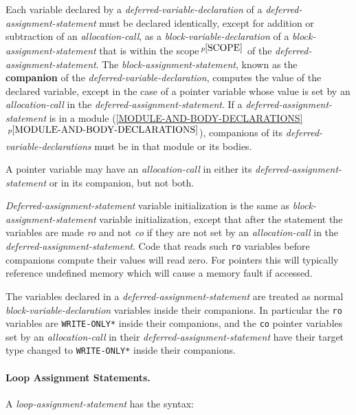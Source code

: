 \documentclass[12pt]{article}
\newcommand{\subsubsubsection}[1]{\paragraph[#1]{#1.}}
\newcommand{\key}[1]{{\rm \bfseries #1}}
\newcommand{\itemref}[1]{\ref{#1}$\,^{p\pageref{#1}}$}
\newcommand{\pagnote}[1]{$\,^{p\pageref{#1}}$}
\newcommand{\EOL}{\penalty \exhyphenpenalty}
\begin{document}
Each variable declared by a {\em deferred-variable-declaration}
of a {\em deferred-assignment-statement} must be declared identically,
except for addition or subtraction of an {\em allocation-call},
as a {\em block-variable-declaration} of a {\em block-assignment-statement}
that is within the scope\pagnote{SCOPE} of the
{\em deferred-assignment-statement}.  The {\em block-assignment-statement},
known as the \key{companion} of the {\em deferred-variable-declaration},
computes the value of the
declared variable, except in the case of a pointer variable whose value is
set by an {\em allocation-call} in the {\em deferred-assignment-statement}.
If a {\em deferred-assignment-statement} is in a module
(\itemref{MODULE-AND-BODY-DECLARATIONS}), companions
of its {\em deferred-variable-declarations}
must be in that module or its bodies.

A pointer variable may have an {\em allocation-call} in either its
{\em deferred-assignment-statement} or in its companion, but not
both.

{\em Deferred-assignment-statement} variable initialization is the
same as {\em block-assignment-state\-ment} variable initialization,
except that after the statement the variables
are made {\em ro} and not {\em co} if they are not set
by an {\em allocation-call} in the {\em deferred-assignment-statement}.
Code that reads such {\tt ro} variables
before companions compute their values will
read zero.  For pointers this will typically reference undefined memory which
will cause a memory fault if accessed.

The variables declared in a {\em deferred-assignment-statement} are treated as
normal {\em block-vari\-able-declaration} variables inside their companions.
In particular the {\tt ro} variables are {\tt *WRITE-\EOL ONLY*}
inside their companions, and the {\tt co} pointer variables set by
an {\em allocation-call} in their {\em deferred-assignment-statement}
have their target type changed to {\tt *WRITE-ONLY*}
inside their companions.

\subsubsubsection{Loop Assignment Statements}
\label{LOOP-ASSIGNMENT-STATEMENTS}

A {\em loop-assignment-statement} has the syntax:
\end{document}
